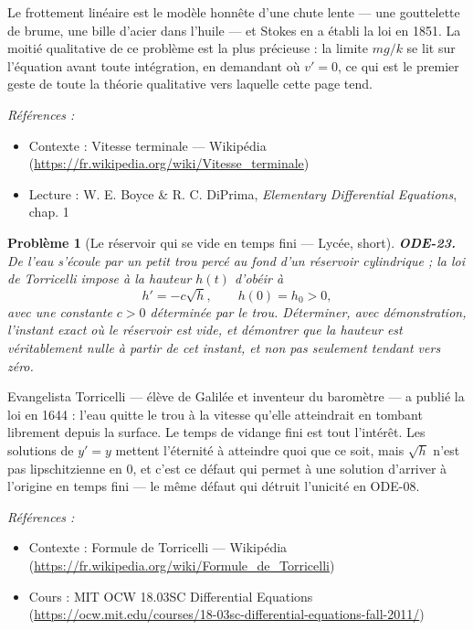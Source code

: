 \documentclass[11pt]{article}
\newtheorem{problem}{Problème}
\newenvironment{refs}{\par\small\noindent\emph{Références :}\begin{itemize}\setlength\itemsep{0pt}}{\end{itemize}\normalsize}
\begin{document}
\noindent Le frottement linéaire est le modèle honnête d'une chute lente --- une
gouttelette de brume, une bille d'acier dans l'huile --- et Stokes en a établi la loi en 1851. La
moitié qualitative de ce problème est la plus précieuse : la limite $ mg/k $ se lit sur
l'équation avant toute intégration, en demandant où $ v' = 0 $, ce qui est le premier geste de
toute la théorie qualitative vers laquelle cette page tend.

\begin{refs}
\item Contexte : Vitesse terminale --- Wikipédia (\url{https://fr.wikipedia.org/wiki/Vitesse_terminale})
\item Lecture : W. E. Boyce \& R. C. DiPrima, \textit{Elementary Differential Equations}, chap. 1
\end{refs}

\bigskip

\begin{problem}[{Le réservoir qui se vide en temps fini --- Lycée, short}]
\textbf{ODE-23.} De l'eau s'écoule par un petit trou percé au fond d'un
réservoir cylindrique ; la loi de Torricelli impose à la hauteur $ h(t) $ d'obéir à
\[ h' = -c\sqrt{h}, \qquad h(0) = h_0 >0, \]
avec une constante $ c >0 $ déterminée par le trou. Déterminer, avec démonstration, l'instant
exact où le réservoir est vide, et démontrer que la hauteur est véritablement nulle à partir de
cet instant, et non pas seulement tendant vers zéro.
\end{problem}

\noindent Evangelista Torricelli --- élève de Galilée et inventeur du baromètre --- a publié
la loi en 1644 : l'eau quitte le trou à la vitesse qu'elle atteindrait en tombant librement depuis
la surface. Le temps de vidange fini est tout l'intérêt. Les solutions de $ y' = y $ mettent
l'éternité à atteindre quoi que ce soit, mais $ \sqrt{h} $ n'est pas lipschitzienne en $ 0 $,
et c'est ce défaut qui permet à une solution d'arriver à l'origine en temps fini --- le même défaut
qui détruit l'unicité en ODE-08.

\begin{refs}
\item Contexte : Formule de Torricelli --- Wikipédia (\url{https://fr.wikipedia.org/wiki/Formule_de_Torricelli})
\item Cours : MIT OCW 18.03SC Differential Equations (\url{https://ocw.mit.edu/courses/18-03sc-differential-equations-fall-2011/})
\end{refs}
\end{document}
